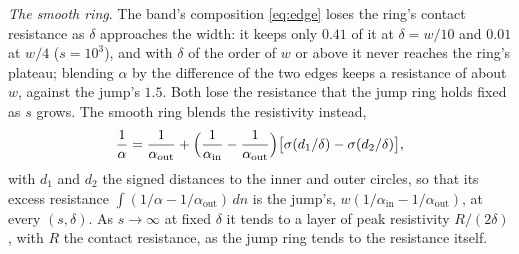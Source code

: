 \documentclass[11pt]{amsart}
\theoremstyle{definition}
\theoremstyle{remark}
\newcommand{\para}[1]{\par\smallskip\noindent\textit{#1}.\enspace}
\begin{document}
\para{The smooth ring}
The band's composition \eqref{eq:edge} loses the ring's contact resistance
as $\delta$ approaches the width: it keeps only $0.41$ of it at
$\delta = w/10$ and $0.01$ at $w/4$ ($s = 10^3$), and with $\delta$ of the
order of $w$ or above it never reaches the ring's plateau;
blending $\alpha$ by the difference of the two edges keeps a resistance of
about $w$, against the jump's $1.5$. Both lose the resistance that the jump ring holds fixed as $s$ grows. The smooth
ring blends the resistivity instead,
\begin{equation}
  \label{eq:smoothring}
  \frac{1}{\alpha} = \frac{1}{\alpha_{\mathrm{out}}} +
  \Bigl( \frac{1}{\alpha_{\mathrm{in}}} - \frac{1}{\alpha_{\mathrm{out}}}
  \Bigr) \bigl[ \sigma(d_1 / \delta) - \sigma(d_2 / \delta) \bigr],
\end{equation}
with $d_1$ and $d_2$ the signed distances to the inner and outer circles, so
that its excess resistance $\int (1/\alpha - 1/\alpha_{\mathrm{out}})\, dn$
is the jump's, $w (1/\alpha_{\mathrm{in}} - 1/\alpha_{\mathrm{out}})$, at
every $(s, \delta)$. As $s \to \infty$ at fixed $\delta$ it tends to a
layer of peak resistivity $R / (2\delta)$, with $R$ the contact resistance,
as the jump ring tends to the resistance itself.
\end{document}
